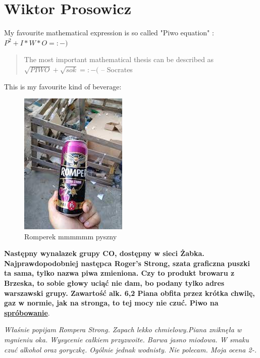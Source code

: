 \section{Wiktor Prosowicz}{\centering}

My favourite mathematical expression is so called "Piwo equation" : \\
\(P^2 + I*W*O =  :-)\)

\vspace{1cm}
\begin{quote}{\small}
    The most important mathematical thesis can be described as \\
    \(\sqrt{PIWO} + \sqrt{sok} = :-(\) -- Socrates
\end{quote}
\vspace{2cm}

This is my favourite kind of beverage:
\begin{figure}[htbp]
    \centering
    \includegraphics[scale=0.6]{Pictures/5_WProsowicz_romperek.jpg}
    \caption{Romperek mmmmmm pyszny}
    \label{fig:romper}
\end{figure}
\vspace{1cm}

\setlength{\parindent}{10ex}
 \textbf{ Następny wynalazek grupy CO, dostępny w sieci Żabka. Najprawdopodobniej następca Roger's Strong, szata graficzna puszki ta sama, tylko nazwa piwa zmieniona. Czy to produkt browaru z Brzeska, to sobie głowy uciąć nie dam, bo podany tylko adres warszawski grupy.
Zawartość alk. 6,2%
Piana obfita przez krótka chwilę, gaz w normie, jak na stronga, to tej mocy nie czuć. Piwo na \underline{spróbowanie}}.\par
\vspace{0.5cm}

\setlength{\parindent}{10ex}
 \textit{Właśnie popijam Rompera Strong. Zapach lekko chmielowy.Piana zniknęła w mgnieniu oka. Wysycenie całkiem przyzwoite. Barwa jasno miodowa. W smaku czuć alkohol oraz goryczkę. Ogólnie jednak wodnisty. Nie polecam. Moja ocena 2-.}
 \par
\vspace{1.0 cm}


